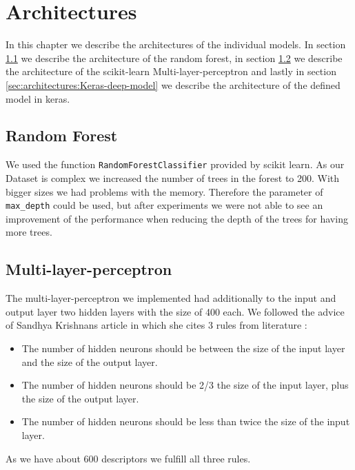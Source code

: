 \documentclass[12pt]{article}
\begin{document}
\section{Architectures}
\label{sec:architectures}
In this chapter we describe the architectures of the individual models. In section \ref{sec:architectures:random forest} we describe the architecture of the random forest, in section \ref{sec:architectures:Multi-layer-perceptron} we describe the architecture of the scikit-learn Multi-layer-perceptron and lastly in section \ref{sec:architectures:Keras-deep-model} we describe the architecture of the defined model in keras.

\subsection{Random Forest}
\label{sec:architectures:random forest}
We used the function \texttt{RandomForestClassifier} provided by scikit learn. As our Dataset is complex we increased the number of trees in the forest to 200. With bigger sizes we had problems with the memory. Therefore the parameter of \texttt{max\_depth} could be used, but after experiments we were not able to see an improvement of the performance when reducing the depth of the trees for having more trees.

\subsection{Multi-layer-perceptron}
\label{sec:architectures:Multi-layer-perceptron}
The multi-layer-perceptron we implemented had additionally to the input and output layer two hidden layers with the size of 400 each. We followed the advice of Sandhya Krishnans \cite{NumNeurons} article in which she cites 3 rules from literature \cite{Neunets2}:
\begin{itemize}
\item The number of hidden neurons should be between the size of the input layer and the size of the output layer.
\item The number of hidden neurons should be 2/3 the size of the input layer, plus the size of the output layer.
\item The number of hidden neurons should be less than twice the size of the input layer.
\end{itemize}

As we have about 600 descriptors we fulfill all three rules.
\end{document}
